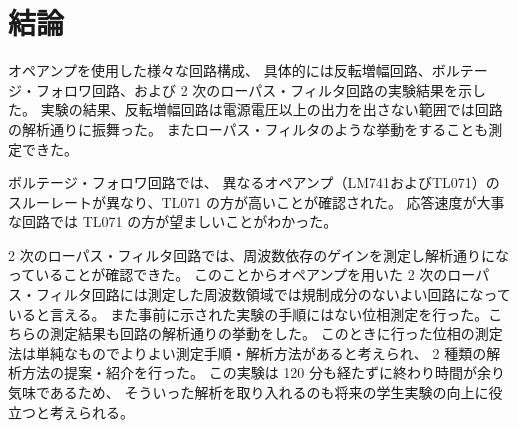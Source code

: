 \documentclass[11pt,dvipdfmx,a4paper]{jsarticle}
\begin{document}
\section{結論}
オペアンプを使用した様々な回路構成、
具体的には反転増幅回路、ボルテージ・フォロワ回路、および 2 次のローパス・フィルタ回路の実験結果を示した。
実験の結果、反転増幅回路は電源電圧以上の出力を出さない範囲では回路の解析通りに振舞った。
またローパス・フィルタのような挙動をすることも測定できた。

ボルテージ・フォロワ回路では、
異なるオペアンプ（LM741およびTL071）のスルーレートが異なり、TL071 の方が高いことが確認された。
応答速度が大事な回路では TL071 の方が望ましいことがわかった。

2 次のローパス・フィルタ回路では、周波数依存のゲインを測定し解析通りになっていることが確認できた。
このことからオペアンプを用いた 2 次のローパス・フィルタ回路には測定した周波数領域では規制成分のないよい回路になっていると言える。
また事前に示された実験の手順にはない位相測定を行った。こちらの測定結果も回路の解析通りの挙動をした。
このときに行った位相の測定法は単純なものでよりよい測定手順・解析方法があると考えられ、
2 種類の解析方法の提案・紹介を行った。
この実験は 120 分も経たずに終わり時間が余り気味であるため、
そういった解析を取り入れるのも将来の学生実験の向上に役立つと考えられる。



\end{document}

